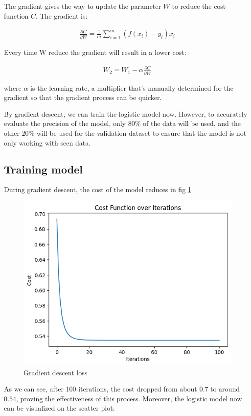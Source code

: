 \documentclass[stu,12pt,floatsintext]{apa7}
\begin{document}
The gradient gives the way to update the parameter $W$ to reduce the cost function $C$. The gradient is:

\begin{gather}
    \frac{\partial C}{\partial W}=\frac{1}{m}\sum^m_{i=1}(f(x_i)-y_i)x_i
\end{gather}

Every time W reduce the gradient will result in a lower cost:

\begin{gather}
    W_2=W_1-\alpha\frac{\partial C}{\partial W}
\end{gather}

where $\alpha$ is the learning rate, a multiplier that's manually determined for the gradient so that the gradient process can be quicker.

By gradient descent, we can train the logistic model now. However, to accurately evaluate the precision of the model, only $80\%$ of the data will be used, and the other $20\%$ will be used for the validation dataset to ensure that the model is not only working with seen data.

\subsection{Training model}

During gradient descent, the cost of the model reduces in fig \ref{fig:gradient-descent-loss}

\begin{figure}[h]
    \centering
    \includegraphics[width=0.6\linewidth]{images/gradient-descent-loss.png}
    \caption{Gradient descent loss}
    \label{fig:gradient-descent-loss}
\end{figure}

As we can see, after 100 iterations, the cost dropped from about $0.7$ to around $0.54$, proving the effectiveness of this process. Moreover, the logistic model now can be visualized on the scatter plot:
\end{document}
